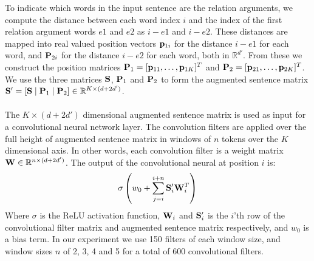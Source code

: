 To indicate which words in the input sentence are the relation arguments, we compute the distance between each word index $i$ and the index of the first relation argument words $e1$ and $e2$ as $i - e1$ and $i - e2$. These distances are mapped into real valued position vectors $\mathbf{p}_{1i}$ for the distance $i - e1$ for each word, and $\mathbf{P}_{2i}$ for the distance $i - e2$ for each word, both in  $\mathbb{R}^{d'}$. From these we construct the position matrices $\mathbf{P}_1 = [\mathbf{p}_{11},\dots,\mathbf{p}_{1K}]^T$ and $\mathbf{P}_2 = [\mathbf{p}_{21},\dots,\mathbf{p}_{2K}]^T$. We use the three matrices $\mathbf{S}$, $\mathbf{P}_1$ and $\mathbf{P}_2$ to form the augmented sentence matrix $\mathbf{S}' = [\mathbf{S} \mid \mathbf{P}_1 \mid \mathbf{P}_2] \in \mathbb{R}^{K \times (d + 2d')}$.
\\\\
The $K \times (d + 2d')$ dimensional augmented sentence matrix is used as input for a convolutional neural network layer. The convolution filters are applied over the full height of augmented sentence matrix in windows of $n$ tokens over the $K$ dimensional axis. In other words, each convolution filter is a weight matrix $\mathbf{W} \in \mathbb{R}^{n \times (d + 2d')}$. The output of the convolutional neural at position $i$ is:
$$
\sigma\left(w_0 + \sum\limits_{j = i}^{i + n}\mathbf{S}'_i\mathbf{W}_i^T\right)
$$
Where $\sigma$ is the ReLU activation function, $\mathbf{W}_i$ and $\mathbf{S}'_i$ is the $i$'th row of the convolutional filter matrix and augmented sentence matrix respectively, and $w_0$ is a bias term. In our experiment we use 150 filters of each window size, and window sizes $n$ of 2, 3, 4 and 5 for a total of 600 convolutional filters.

